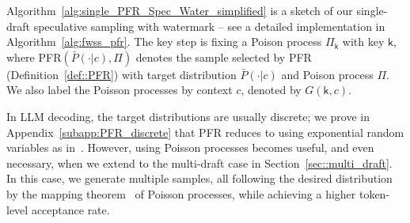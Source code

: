 \documentclass{article}
\theoremstyle{plain}
\theoremstyle{definition}
\begin{document}
Algorithm~\ref{alg:single_PFR_Spec_Water_simplified} is a sketch of our single-draft speculative sampling with watermark -- see a detailed implementation %
in Algorithm~\ref{alg:fwss_pfr}. 
The key step is fixing a Poison process $\Pi_\mathsf{k}$ with key $\mathsf{k}$, where %
PFR$(\bar{P}(\cdot | c),\Pi )$ denotes the sample selected by PFR (Definition~\ref{def::PFR}) with target distribution $\bar{P}(\cdot | c)$ and Poison process $\Pi$. %
We also label the Poisson processes by context $c$, denoted by $G(\mathsf{k}, c)$. 
\begin{algorithm}[tbp]
\SetAlgoLined
\DontPrintSemicolon
\SetAlgoNoEnd
{}


\caption{Watermarkable Speculative Sampling via Poisson Processes (Simplified)}
\label{alg:single_PFR_Spec_Water_simplified} 
\vspace{-2pt}
\end{algorithm}


In LLM decoding, the target distributions are usually discrete; we prove in Appendix~\ref{subapp:PFR_discrete} that PFR reduces to using exponential random variables as in~\citep{kobus2025speculative}.
However, using Poisson processes becomes useful, and even necessary, when we extend to the multi-draft case in Section~\ref{sec::multi_draft}. In this case, %
we generate multiple samples, all following the desired distribution by the mapping theorem~\citep{last2017lectures} of Poisson processes, while achieving a higher token-level acceptance rate. 
\end{document}
